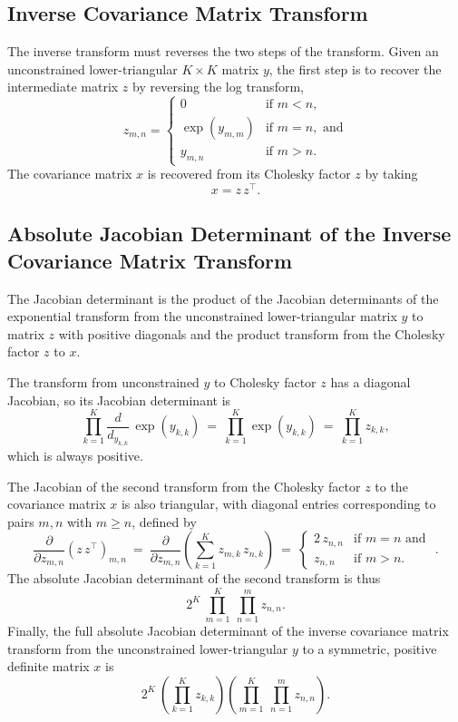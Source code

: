 \documentclass[10pt]{report}
\begin{document}
\subsection{Inverse Covariance Matrix Transform}

The inverse transform must reverses the two steps of the transform.
Given an unconstrained lower-triangular $K \times K$ matrix $y$, the
first step is to recover the intermediate matrix $z$ by reversing the
log transform,
\[
z_{m,n} = 
\left\{
\begin{array}{cl}
0 & \mbox{if } m < n,
\\[4pt]
\exp(y_{m,m}) & \mbox{if } m = n, \mbox{ and}
\\[4pt]
y_{m,n} & \mbox{if } m > n.
\end{array}
\right.
\]
%
The covariance matrix $x$ is recovered from its Cholesky factor $z$ by
taking
%
\[
x = z \, z^{\top}.
\]

\subsection{Absolute Jacobian Determinant of the Inverse Covariance
  Matrix Transform}

The Jacobian determinant is the product of the Jacobian determinants
of the exponential transform from the unconstrained lower-triangular
matrix $y$ to matrix $z$ with positive diagonals and the product
transform from the Cholesky factor $z$ to $x$.

The transform from unconstrained $y$ to Cholesky factor $z$ has a
diagonal Jacobian, so its Jacobian determinant is
%
\[
\prod_{k=1}^K  \frac{d}{d_{y_{k,k}}} \, \exp(y_{k,k})
\ = \ 
\prod_{k=1}^K \exp(y_{k,k})
\ = \
\prod_{k=1}^K z_{k,k},
\]
which is always positive.

The Jacobian of the second transform from the Cholesky factor $z$ to
the covariance matrix $x$ is also triangular, with diagonal entries
corresponding to pairs $m,n$ with $m \geq n$, defined by
\[
\frac{\partial}{\partial z_{m,n}}
\left( z \, z^{\top} \right)_{m,n}
\ = \
\frac{\partial}{\partial z_{m,n}}
\left( \sum_{k=1}^K z_{m,k} \, z_{n,k} \right)
\ = \
\left\{
\begin{array}{cl}
2 \, z_{n,n} & \mbox{if } m = n \mbox{ and }
\\[4pt]
z_{n,n} & \mbox{if } m > n.
\end{array}
\right.
.
\]
%
The absolute Jacobian determinant of the second transform is thus
\[
2^{K} 
\
\prod_{m = 1}^{K} \ \prod_{n=1}^{m} z_{n,n}.
\]
Finally, the full absolute Jacobian determinant of the inverse
covariance matrix transform from the unconstrained lower-triangular 
$y$ to a symmetric, positive definite matrix $x$ is
\[
2^{K} 
\
\left( \prod_{k=1}^K z_{k,k} \right)
\left( \prod_{m = 1}^{K} \ \prod_{n=1}^{m} z_{n,n} \right).
\]
\end{document}
